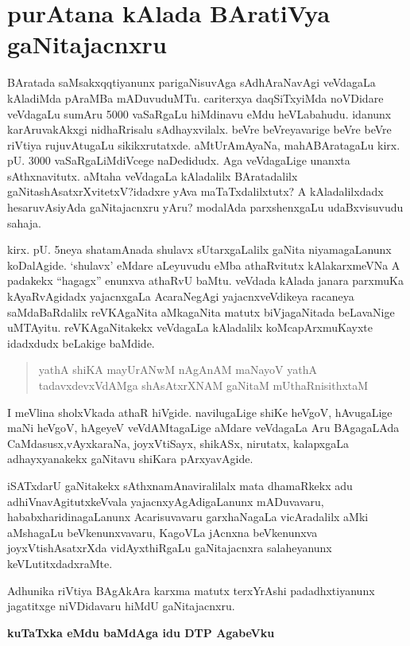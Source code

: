 \chapter{purAtana kAlada BAratiVya gaNitajacnxru}

 BAratada saMsakxqqtiyanunx parigaNisuvAga sAdhAraNavAgi veVdagaLa kAladiMda pAraMBa mADuvuduMTu. cariterxya daqSiTxyiMda noVDidare veVdagaLu sumAru {\rm 5000} vaSaRgaLu hiMdinavu eMdu heVLabahudu. idanunx karAruvakAkxgi nidhaRrisalu sAdhayx\-vilalx. beVre beVreyavarige beVre beVre riVtiya rujuvAtugaLu sikikxrutatxde. aMtU\break rAmAyaNa, mahABAratagaLu kirx. pU. {\rm 3000} vaSaRgaLiMdiVcege naDedidudx. Aga veVdagaLige unanxta sAthxnavitutx. aMtaha veVdagaLa kAladalilx BAratadalilx gaNitashAsatxrXvitetxV?\break idadxre yAva maTaTxdalilxtutx? A kAladalilxdadx hesaruvAsiyAda gaNitajacnxru yAru? modalAda parxshenxgaLu udaBxvisuvudu sahaja.

kirx. pU. {\rm 5}neya shatamAnada shulavx sUtarxgaLalilx gaNita niyamagaLanunx koDalAgide. `shulavx' eMdare aLeyuvudu eMba athaRvitutx kAlakarxmeVNa A padakekx ``hagagx'' enunxva athaRvU baMtu. veVdada kAlada janara parxmuKa kAyaRvAgidadx yajacnxgaLa AcaraNegAgi yajacnxveVdikeya racaneya saMdaBaRdalilx reVKAgaNita aMkagaNita matutx biVja\-gaNitada beLavaNige uMTAyitu. reVKAgaNitakekx veVdagaLa kAladalilx koMca\break pArxmuKayxte idadxdudx beLakige baMdide.
\begin{verse}
yathA shiKA mayUrANwM nAgAnAM maNayoV yathA\\
tadavxdevxVdAMga shAsAtxrXNAM gaNitaM mUthaRnisithxtaM
\end{verse}

I meVlina sholxVkada athaR hiVgide. navilugaLige shiKe heVgoV, hAvugaLige maNi heVgoV, hAgeyeV veVdAMtagaLige aMdare veVdagaLa Aru BAgagaLAda CaMdasusx,\break vAyxkaraNa, joyxVtiSayx, shikASx, nirutatx, kalapxgaLa adhayxyanakekx gaNitavu shiKara pArxyavAgide.

iSATxdarU gaNitakekx sAthxnamAnaviralilalx mata dhamaRkekx adu adhiVnavAgitutx\break keVvala yajacnxyAgAdigaLanunx mADuvavaru, hababxharidinagaLanunx Acarisuvavaru garxhaNa\-gaLa vicAradalilx aMki aMshagaLu beVkenunxvavaru, KagoVLa jAcnxna beVkenunxva joyxVti\-shAsatxrXda vidAyxthiRgaLu gaNitajacnxra salaheyanunx keVLutitxdadxraMte.

Adhunika riVtiya BAgAkAra karxma matutx terxYrAshi padadhxtiyanunx jagatitxge niVDidavaru hiMdU gaNitajacnxru.

\begin{center}
\textbf{kuTaTxka eMdu baMdAga idu {\rm DTP} AgabeVku}
\end{center}

